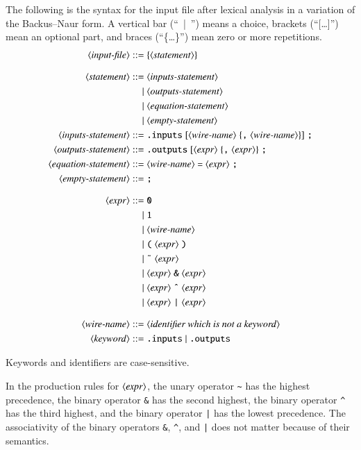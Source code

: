 \documentclass[letterpaper,11pt]{article}
\newcommand{\param}[1]{\ensuremath{\langle\text{\textit{#1}}\rangle}}
\begin{document}
The following is the syntax for the input file after lexical analysis
in a variation of the Backus--Naur form.
A vertical bar (``~|~'') means a choice,
brackets (``[\ldots]'') mean an optional part,
and braces (``\{\ldots\}'') mean zero or more repetitions.
\begin{align*}
  \param{input-file} ::=\; & \{\param{statement}\} \\[0.5\baselineskip]
%
  \param{statement} ::=\; & \param{inputs-statement} \\
  |\; & \param{outputs-statement} \\
  |\; & \param{equation-statement} \\
  |\; & \param{empty-statement} \\
  \param{inputs-statement} ::=\; & \text{\texttt{.inputs}}\;[\param{wire-name} \; \{\text{\texttt{,}}\;\param{wire-name}\}]\;\text{\texttt{;}} \\
  \param{outputs-statement} ::=\; & \text{\texttt{.outputs}}\;[\param{expr} \; \{\text{\texttt{,}}\;\param{expr}\}\;\text{\texttt{;}} \\
  \param{equation-statement} ::=\; & \param{wire-name}\;\text{\texttt{=}}\;\param{expr}\;\text{\texttt{;}} \\
  \param{empty-statement} ::=\; & \text{\texttt{;}} \\[0.5\baselineskip]
%
  \param{expr} ::=\; & \texttt{0} \\
  |\; & \texttt{1} \\
  |\; & \param{wire-name} \\
  |\; & \text{\texttt{(}}\;\param{expr}\;\text{\texttt{)}} \\
  |\; & \text{\texttt{\~{}}}\;\param{expr} \\
  |\; & \param{expr}\;\text{\texttt{\&}}\;\param{expr} \\
  |\; & \param{expr}\;\text{\texttt{\^}}\;\param{expr} \\
  |\; & \param{expr}\;\text{\texttt{|}}\;\param{expr} \\[0.5\baselineskip]
%
  \param{wire-name} ::=\; & \param{identifier which is not a keyword} \\
  \param{keyword} ::=\; & \text{\texttt{.inputs}} \;|\; \text{\texttt{.outputs}}
\end{align*}

Keywords and identifiers are case-sensitive.

In the production rules for \param{expr},
the unary operator \verb|~| has the highest precedence,
the binary operator \verb|&| has the second highest,
the binary operator \verb|^| has the third highest,
and the binary operator \verb#|# has the lowest precedence.
The associativity of the binary operators \verb|&|, \verb|^|, and \verb#|#
does not matter because of their semantics.
\end{document}
